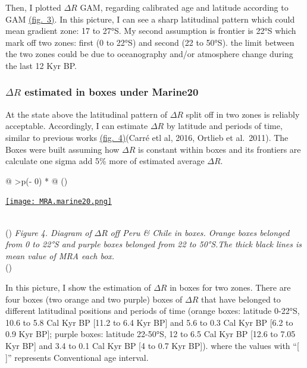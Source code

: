 \documentclass[
]{article}
\begin{document}
Then, I plotted \(\Delta R\) GAM, regarding calibrated age and latitude
according to GAM
\protect\hyperlink{latitudinal-distGribution-of-mra-off-peru-to-chile}{(fig.~3)}.
In this picture, I can see a sharp latitudinal pattern which could mean
gradient zone: 17 to 27°S. My second assumption is frontier is 22°S
which mark off two zones: first (0 to 22°S) and second (22 to 50°S). the
limit between the two zones could be due to oceanography and/or
atmosphere change during the last 12 Kyr BP.

\hypertarget{delta-r-estimated-in-boxes-under-marine20}{%
\subsubsection{\texorpdfstring{\(\Delta R\) estimated in boxes under
Marine20}{\textbackslash Delta R estimated in boxes under Marine20}}\label{delta-r-estimated-in-boxes-under-marine20}}

At the state above the latitudinal pattern of \(\Delta R\) split off in
two zones is reliably acceptable. Accordingly, I can estimate
\(\Delta R\) by latitude and periods of time, similar to previous works
\protect\hyperlink{local-mra-estimated-under-marine20}{(fig.~4)}(Carré
etl al, 2016, Ortlieb et al.~2011). The Boxes were built assuming how
\(\Delta R\) is constant within boxes and its frontiers are calculate
one sigma add 5\% more of estimated average \(\Delta R\).

\begin{longtable}[]{@{}
  >{\centering\arraybackslash}p{(\columnwidth - 0\tabcolsep) * }@{}}
\toprule()
\begin{minipage}[b]{\linewidth}\centering
\href{https://github.com/jasb3110/Radiocarbon-reservoir/blob/db842ff0620d55ea5ca5ceec0d96a369406b6e3c/MRA.marine20.png?raw=true}{\texttt{[image: MRA.marine20.png]}}
\end{minipage} \\
\midrule()
\endhead
\emph{Figure 4. Diagram of} \(\Delta R\) \emph{off Peru \& Chile in
boxes. Orange boxes belonged from 0 to 22°S and purple boxes belonged
from 22 to 50°S.The thick black lines is mean value of MRA each box.} \\
\bottomrule()
\end{longtable}

In this picture, I show the estimation of \(\Delta R\) in boxes for two
zones. There are four boxes (two orange and two purple) boxes of
\(\Delta R\) that have belonged to different latitudinal positions and
periods of time (orange boxes: latitude 0-22°S, 10.6 to 5.8 Cal Kyr BP
{[}11.2 to 6.4 Kyr BP{]} and 5.6 to 0.3 Cal Kyr BP {[}6.2 to 0.9 Kyr
BP{]}; purple boxes: latitude 22-50°S, 12 to 6.5 Cal Kyr BP {[}12.6 to
7.05 Kyr BP{]} and 3.4 to 0.1 Cal Kyr BP {[}4 to 0.7 Kyr BP{]}). where
the values with ``{[} {]}'' represents Conventional age interval.
\end{document}
